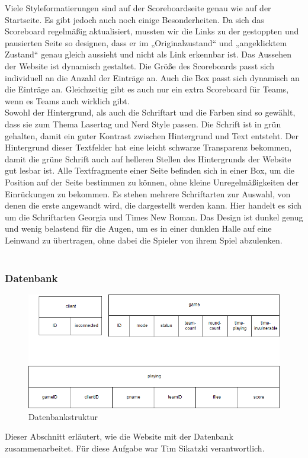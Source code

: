 Viele Styleformatierungen sind auf der Scoreboardseite genau wie auf der Startseite. Es gibt jedoch auch noch einige Besonderheiten. Da sich das Scoreboard regelmäßig aktualisiert, mussten wir die Links zu der gestoppten und pausierten Seite so designen, dass er im „Originalzustand“ und „angeklicktem Zustand“ genau gleich aussieht und nicht als Link erkennbar ist.
Das Aussehen der Website ist dynamisch gestaltet. Die Größe des Scoreboards passt sich individuell an die Anzahl der Einträge an. Auch die Box passt sich dynamisch an die Einträge an. Gleichzeitig gibt es auch nur ein extra Scoreboard für Teams, wenn es Teams auch wirklich gibt.\\ Sowohl der Hintergrund, als auch die Schriftart und die Farben sind so gewählt, dass sie zum Thema Lasertag und Nerd Style passen. 
Die Schrift ist in grün gehalten, damit ein guter Kontrast zwischen Hintergrund und Text entsteht. Der Hintergrund dieser Textfelder hat eine leicht schwarze Transparenz bekommen, damit die grüne Schrift auch auf helleren Stellen des Hintergrunds der Website gut lesbar ist. Alle Textfragmente einer Seite befinden sich in einer Box, um die Position auf der Seite bestimmen zu können, ohne kleine Unregelmäßigkeiten der Einrückungen zu bekommen. Es stehen mehrere Schriftarten zur Auswahl, von denen die erste angewandt wird, die dargestellt werden kann. Hier handelt es sich um die Schriftarten Georgia und Times New Roman. Das Design ist dunkel genug und wenig belastend für die Augen, um es in einer dunklen Halle auf eine Leinwand zu übertragen, ohne dabei die Spieler von ihrem Spiel abzulenken. \\\\


\subsubsection{Datenbank}
\label{sec:services-datenbank}
\begin{figure}[htb]
	\begin{center}
		\includegraphics[width=0.8 \textwidth]{Databasestrucb.png}
		\caption{Datenbankstruktur}
		\label{fig:database}
	\end{center}
\end{figure}
Dieser Abschnitt erläutert, wie die Website mit der Datenbank zusammenarbeitet. Für diese Aufgabe war Tim Sikatzki verantwortlich.

